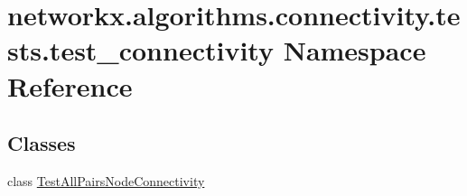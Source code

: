 \hypertarget{namespacenetworkx_1_1algorithms_1_1connectivity_1_1tests_1_1test__connectivity}{}\section{networkx.\+algorithms.\+connectivity.\+tests.\+test\+\_\+connectivity Namespace Reference}
\label{namespacenetworkx_1_1algorithms_1_1connectivity_1_1tests_1_1test__connectivity}
\subsection*{Classes}
\begin{DoxyCompactItemize}
\item 
class \hyperlink{classnetworkx_1_1algorithms_1_1connectivity_1_1tests_1_1test__connectivity_1_1TestAllPairsNodeConnectivity}{Test\+All\+Pairs\+Node\+Connectivity}
\end{DoxyCompactItemize}
